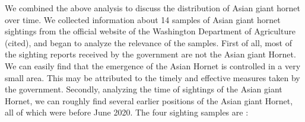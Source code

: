 \documentclass{mcmthesis}
\numberwithin{figure}{section}
\numberwithin{table}{section}
\begin{document}
We combined the above analysis to discuss the distribution of Asian giant hornet over time. We collected information about 14 samples of Asian giant hornet sightings from the official website of the Washington Department of Agriculture (cited), and began to analyze the relevance of the samples. First of all, most of the sighting reports received by the government are not the Asian giant Hornet. We can easily find that the emergence of the Asian Hornet is controlled in a very small area. This may be attributed to the timely and effective measures taken by the government. Secondly, analyzing the time of sightings of the Asian giant Hornet, we can roughly find several earlier positions of the Asian giant Hornet, all of which were before June 2020. The four sighting samples are :
\begin{figure}[H]
  \centering
  \hspace{0in}
  \hspace{0in}
\end{figure}
\end{document}
